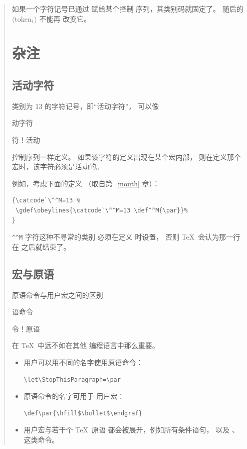 \documentclass[a4paper]{rapport3}
\def\gr#1{$\langle$#1$\rangle$}\def\key#1{{\tt#1}}
\newenvironment{disp}{\begin{quotation}}{\end{quotation}}
\def\term#1\par{\index{#1}}
\begin{document}
\begin{disp}
如果一个字符记号已通过  赋给某个控制
序列，其类别码就固定了。
随后的 \gr{token$_1$} 不能再
改变它。

\section{杂注}

\subsection{活动字符}

类别为 13 的字符记号，即“活动字符”，
\altt
可以像
\term 活动字符\par\term 字符！活动\par
控制序列一样定义。
如果该字符的定义出现在某个宏内部，
则在定义那个宏时，该字符必须是活动的。

例如，考虑下面的定义
（取自第~\ref{mouth} 章）：\begin{verbatim}
{\catcode`\^^M=13 %
 \gdef\obeylines{\catcode`\^^M=13 \def^^M{\par}}%
}
\end{verbatim}
\verb>^^M> 字符这种不寻常的类别
必须在定义  时设置，
否则 \TeX\ 会认为那一行在 
之后就结束了。

\subsection{宏与原语}

原语命令与用户宏之间的区别
\term 原语命令\par\term 命令！原语\par
在 \TeX\ 中远不如在其他
编程语言中那么重要。\begin{itemize}
\item 用户可以用不同的名字使用原语命令：
      \begin{verbatim}
\let\StopThisParagraph=\par
\end{verbatim}
\item 原语命令的名字可用于
      用户宏： \begin{verbatim}
\def\par{\hfill$\bullet$\endgraf}
\end{verbatim}
\item 用户宏与若干个 \TeX\ 原语
      都会被展开，例如所有条件语句，
      以及 、~ 这类命令。
\end{itemize}


\end{disp}
\end{document}
